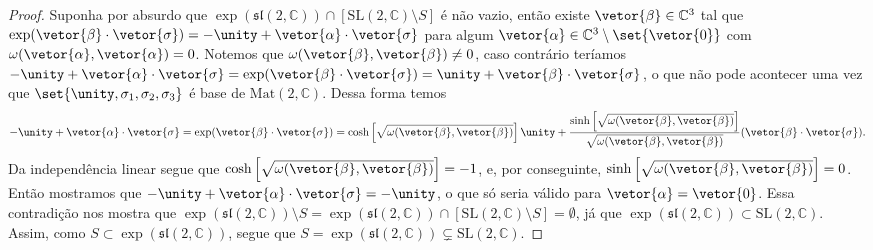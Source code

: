 \begin{proof}
    Suponha por absurdo que \(\exp(\mathfrak{sl}(2,\mathbb{C})) \cap \left[\mathrm{SL}(2,\mathbb{C})\setminus S\right]\) é não vazio, então existe \(\vetor{\beta} \in \mathbb{C}^3\) tal que \(\exp(\vetor{\beta}\cdot \vetor{\sigma}) = -\unity + \vetor{\alpha}\cdot\vetor{\sigma}\) para algum \(\vetor{\alpha} \in \mathbb{C}^3 \setminus \set{\vetor{0}}\) com \(\omega(\vetor{\alpha}, \vetor{\alpha}) = 0\). Notemos que \(\omega(\vetor{\beta},\vetor{\beta}) \neq 0\), caso contrário teríamos \(-\unity + \vetor{\alpha} \cdot \vetor{\sigma} = \exp(\vetor{\beta}\cdot \vetor{\sigma}) = \unity + \vetor{\beta}\cdot\vetor{\sigma}\), o que não pode acontecer uma vez que \(\set{\unity, \sigma_1, \sigma_2, \sigma_3}\) é base de \(\mathrm{Mat}(2, \mathbb{C})\). Dessa forma temos
    \begin{equation*}
        -\unity + \vetor{\alpha}\cdot\vetor{\sigma} = \exp(\vetor{\beta}\cdot \vetor{\sigma}) = \cosh\left[\sqrt{\omega(\vetor{\beta},\vetor{\beta})}\right] \unity + \frac{\sinh\left[\sqrt{\omega(\vetor{\beta}, \vetor{\beta})}\right]}{\sqrt{\omega(\vetor{\beta},\vetor{\beta})}}(\vetor{\beta}\cdot\vetor{\sigma}).
    \end{equation*}
    Da independência linear segue que \(\cosh\left[\sqrt{\omega(\vetor{\beta}, \vetor{\beta})}\right] = -1\), e, por conseguinte, \(\sinh\left[\sqrt{\omega(\vetor{\beta}, \vetor{\beta})}\right] = 0\). Então mostramos que \(-\unity + \vetor{\alpha} \cdot \vetor{\sigma} = -\unity\), o que só seria válido para \(\vetor{\alpha} = \vetor{0}\). Essa contradição nos mostra que \( \exp(\mathfrak{sl}(2,\mathbb{C})) \setminus S = \exp(\mathfrak{sl}(2,\mathbb{C})) \cap \left[\mathrm{SL}(2,\mathbb{C})\setminus S\right] =\emptyset\), já que \(\exp(\mathfrak{sl}(2,\mathbb{C})) \subset \mathrm{SL}(2,\mathbb{C})\). Assim, como \(S \subset \exp(\mathfrak{sl}(2,\mathbb{C}))\), segue que \(S = \exp(\mathfrak{sl}(2, \mathbb{C})) \subsetneq \mathrm{SL}(2,\mathbb{C})\).
\end{proof}
